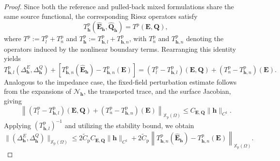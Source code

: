 \documentclass[12pt,reqno]{amsart}
\theoremstyle{definition}
\numberwithin{equation}{section}
\begin{document}
\begin{proof}
Since both the reference and pulled-back mixed formulations share the same source functional, the corresponding Riesz operators satisfy
\[
T_{\mathbf{h}}^{\mathrm{p}} (\hat{\mathbf{E}}_{\mathbf{h}}, \hat{\mathbf{Q}}_{\mathbf{h}}) = T^{\mathrm{p}}(\mathbf{E}, \mathbf{Q}),
\]
where $T^{\mathrm{p}} := T_l^{\mathrm{p}} + T_n^{\mathrm{p}}$ and $T_{\mathbf{h}}^{\mathrm{p}} := T_{\mathbf{h},l}^{\mathrm{p}} + T_{\mathbf{h},n}^{\mathrm{p}}$, with $T_n^{\mathrm{p}}$ and $T_{\mathbf{h},n}^{\mathrm{p}}$ denoting the operators induced by the nonlinear boundary terms. Rearranging this identity yields
\[
T_{\mathbf{h},l}^{\mathrm{p}}(\Delta_{\mathbf{h}}^E, \Delta_{\mathbf{h}}^Q) + \left[ T_{\mathbf{h},n}^{\mathrm{p}}(\hat{\mathbf{E}}_{\mathbf{h}}) - T_{\mathbf{h},n}^{\mathrm{p}}(\mathbf{E}) \right] = (T_l^{\mathrm{p}} - T_{\mathbf{h},l}^{\mathrm{p}})(\mathbf{E}, \mathbf{Q}) + (T_n^{\mathrm{p}} - T_{\mathbf{h},n}^{\mathrm{p}})(\mathbf{E}).
\]
Analogous to the impedance case, the fixed-field perturbation estimate follows from the expansions of $\mathcal{N}_{\mathbf{h}}$, the transported trace, and the surface Jacobian, giving
\[
\left\| (T_l^{\mathrm{p}} - T_{\mathbf{h},l}^{\mathrm{p}})(\mathbf{E}, \mathbf{Q}) + (T_n^{\mathrm{p}} - T_{\mathbf{h},n}^{\mathrm{p}})(\mathbf{E}) \right\|_{\mathbb{X}_{\mathrm{p}}(\Omega)} \le C_{\mathbf{E}, \mathbf{Q}} \|\mathbf{h}\|_{C^1}.
\]
Applying $(T_{\mathbf{h},l}^{\mathrm{p}})^{-1}$ and utilizing the stability bound, we obtain
\begin{equation} \label{eq:NPEC_stability_intermediate}
\|(\Delta_{\mathbf{h}}^E, \Delta_{\mathbf{h}}^Q)\|_{\mathbb{X}_{\mathrm{p}}(\Omega)} \le 2\widetilde{C}_{\mathrm{p}} C_{\mathbf{E}, \mathbf{Q}} \|\mathbf{h}\|_{C^1} + 2\widetilde{C}_{\mathrm{p}} \left\| T_{\mathbf{h},n}^{\mathrm{p}}(\hat{\mathbf{E}}_{\mathbf{h}}) - T_{\mathbf{h},n}^{\mathrm{p}}(\mathbf{E}) \right\|_{\mathbb{X}_{\mathrm{p}}(\Omega)}.
\end{equation}


\end{proof}
\end{document}
